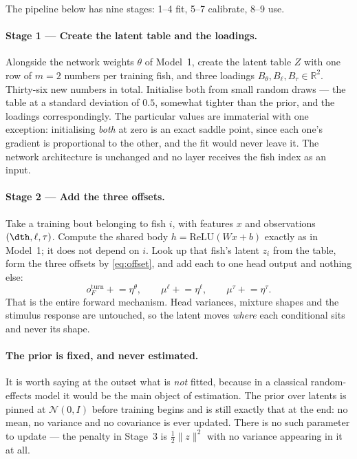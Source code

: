 The pipeline below has nine stages: 1--4 fit, 5--7 calibrate, 8--9 use.

\paragraph{Stage 1 --- Create the latent table and the loadings.}
Alongside the network weights $\theta$ of Model~1, create the latent table $Z$
with one row of $m=2$ numbers per training fish, and three loadings
$B_\theta,B_\ell,B_\tau\in\mathbb{R}^2$. Thirty-six new numbers in total.
Initialise both from small random draws --- the table at a standard deviation of
$0.5$, somewhat tighter than the prior, and the loadings correspondingly. The
particular values are immaterial with one exception: initialising \emph{both} at
zero is an exact
saddle point, since each one's gradient is proportional to the other, and the
fit would never leave it. The network architecture is unchanged and no layer
receives the fish index as an input.

\paragraph{Stage 2 --- Add the three offsets.}
Take a training bout belonging to fish $i$, with features $x$ and observations
$(\dth,\ell,\tau)$. Compute the shared body $h=\mathrm{ReLU}(Wx+b)$ exactly as
in Model~1; it does not depend on $i$. Look up that fish's latent $z_i$ from the
table, form the three offsets by \eqref{eq:offset}, and add each to one head
output and nothing else:
\[
o^{\text{turn}}_F \mathrel{+}= \eta^{\theta},\qquad
\mu^\ell \mathrel{+}= \eta^{\ell},\qquad
\mu^\tau \mathrel{+}= \eta^{\tau}.
\]
That is the entire forward mechanism. Head variances, mixture shapes and the
stimulus response are untouched, so the latent moves \emph{where} each
conditional sits and never its shape.

\paragraph{The prior is fixed, and never estimated.}
It is worth saying at the outset what is \emph{not} fitted, because in a
classical random-effects model it would be the main object of estimation. The
prior over latents is pinned at $\mathcal{N}(0,I)$ before training begins and is
still exactly that at the end: no mean, no variance and no covariance is ever
updated. There is no such parameter to update --- the penalty in Stage~3 is
$\tfrac12\lVert z\rVert^{2}$ with no variance appearing in it at all.

